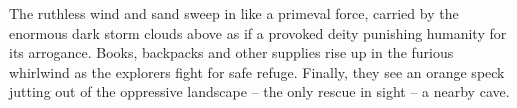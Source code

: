  The ruthless wind and sand sweep in like a primeval force, carried by the enormous dark storm clouds above as if a provoked deity punishing humanity for its arrogance. Books, backpacks and other supplies rise up in the furious whirlwind as the explorers fight for safe refuge. Finally, they see an orange speck jutting out of the oppressive landscape -- the only rescue in sight -- a nearby cave.